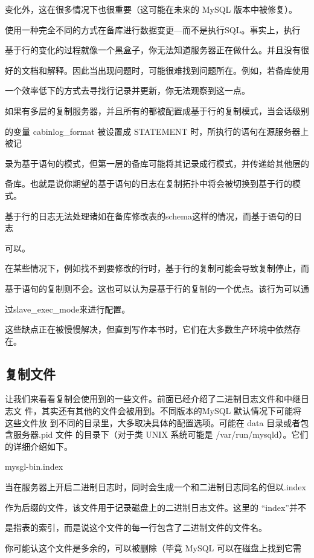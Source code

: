 变化外，这在很多情况下也很重要（这可能在未来的 MySQL 版本中被修复）。

使用一种完全不同的方式在备库进行数据变更—而不是执行SQL。事实上，执行

基于行的变化的过程就像一个黑盒子，你无法知道服务器正在做什么。并且没有很

好的文档和解释。因此当出现问题时，可能很难找到问题所在。例如，若备库使用

一个效率低下的方式去寻找行记录并更新，你无法观察到这一点。

如果有多层的复制服务器，并且所有的都被配置成基于行的复制模式，当会话级别

的变量 cabinlog\_format 被设置成 STATEMENT 时，所执行的语句在源服务器上被记

录为基于语句的模式，但第一层的备库可能将其记录成行模式，并传递给其他层的

备库。也就是说你期望的基于语句的日志在复制拓扑中将会被切换到基于行的模式。

基于行的日志无法处理诸如在备库修改表的schema这样的情况，而基于语句的日志

可以。

在某些情况下，例如找不到要修改的行时，基于行的复制可能会导致复制停止，而

基于语句的复制则不会。这也可以认为是基于行的复制的一个优点。该行为可以通

过slave\_exec\_mode来进行配置。

这些缺点正在被慢慢解决，但直到写作本书时，它们在大多数生产环境中依然存在。

\subsection{复制文件}
让我们来看看复制会使用到的一些文件。前面已经介绍了二进制日志文件和中继日志文
件，其实还有其他的文件会被用到。不同版本的MySQL 默认情况下可能将这些文件放
到不同的目录里，大多取决具体的配置选项。可能在 data 目录或者包含服务器.pid 文件
的目录下（对于类 UNIX 系统可能是 /var/run/mysqld）。它们的详细介绍如下。

mysgl-bin.index

当在服务器上开启二进制日志时，同时会生成一个和二进制日志同名的但以.index

作为后缀的文件，该文件用于记录磁盘上的二进制日志文件。这里的 “index”并不

是指表的索引，而是说这个文件的每一行包含了二进制文件的文件名。

你可能认这个文件是多余的，可以被删除（毕竟 MySQL 可以在磁盘上找到它需

